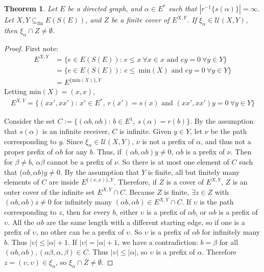 \documentclass{article}
\newtheorem*{theorem}{Theorem}
\begin{document}
\begin{theorem} Let $E$ be a directed graph, and $\alpha \in E^*$ such that $|r^{-1}\{s(\alpha)\}| = \infty$.
Let $X, Y \subseteq_{\text{fin}} E(S(E))$, and $Z$ be a finite cover of $E^{X, Y}$.
If $\xi_\alpha \in \mathcal{U}(X, Y)$, then $\xi_\alpha \cap Z \neq \emptyset$. \end{theorem}
\begin{proof}
First note:
\begin{align*}
    E^{X, Y} &= \{ e \in E(S(E))\text{: } e \leq x \ \forall x \in x \text{ and } ey = 0 \ \forall y \in Y \} \\
             &= \{ e \in E(S(E))\text{: } e \leq \ \text{min}(X) \text{ and } ey = 0 \ \forall y \in Y \} \\
             &= E^{\{\text{min}(X)\}, Y}
\end{align*}
Letting min$(X) = (x, x)$,
\begin{align*}
    E^{X, Y} = \{ (xx', xx') \text{: } x' \in E^*, \ r(x') = s(x) \text{ and } (xx', xx')y = 0 \ \forall y \in Y \}
\end{align*}

Consider the set $C := \{ (\alpha b, \alpha b)\text{: } b \in E^1, \ s(\alpha) = r(b) \}$. By the assumption
that $s(\alpha)$ is an infinite receiver, $C$ is infinite. Given $y \in Y$, let $\nu$ be the path corresponding to $y$.
Since $\xi_\alpha \in \mathcal{U}(X, Y)$, $\nu$ is not a prefix of $\alpha$, and thus not a proper prefix of $\alpha b$ 
for any $b$. Thus, if $(\alpha b, \alpha b)y \neq 0$, $\alpha b$ is a prefix of $\nu$. Then for $\beta \neq b$, 
$\alpha \beta$ cannot be a prefix of $\nu$. So there is at most one element of $C$ such that ($\alpha b, \alpha b)y \neq 0$.
By the assumption that $Y$ is finite, all but finitely many elements of $C$ are inside $E^{\{(x, x)\}, Y}$. Therefore, if $Z$
is a cover of $E^{X, Y}$, $Z$ is an outer cover of the infinite set $E^{X, Y} \cap C$. Because $Z$ is finite, $\exists z \in Z$ 
with $(\alpha b, \alpha b)z \neq 0$ for infinitely many $(\alpha b, \alpha b) \in E^{X, Y} \cap C$. If $\upsilon$ is the path corresponding to $z$,
then for every $b$, either $\upsilon$ is a prefix of $\alpha b$, or $\alpha b$ is a prefix of $\upsilon$.
All the $\alpha b$ are the same length with a different starting edge, so if one is a prefix of $\upsilon$,
no other can be a prefix of $\upsilon$. So $\upsilon$ is a prefix of $\alpha b$ for infinitely many $b$. Thus $|\upsilon| \leq |\alpha| + 1$.
If $|\upsilon| = |\alpha| + 1$, we have a contradiction: $b = \beta$ for all $(\alpha b, \alpha b), (\alpha \beta, \alpha, \beta) \in C$.
Thus $|\upsilon| \leq |\alpha|$, so $\upsilon$ is a prefix of $\alpha$. Therefore $z = (\upsilon, \upsilon) \in \xi_\alpha$, so 
$\xi_\alpha \cap Z \neq \emptyset$.
\end{proof}
\end{document}
